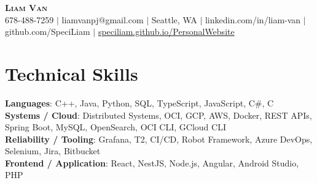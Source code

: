 \documentclass[letterpaper,11pt]{article}
\begin{document}

%
\begin{center}
    \textbf{\Huge \scshape Liam Van} \\ \vspace{1pt}
    \small 678-488-7259 $|$ \small {liamvanpj@gmail.com} $|$ Seattle, WA
 {{$|$ linkedin.com/in/liam-van} {$|$ github.com/SpeciLiam} {$|$ \href{https://speciliam.github.io/PersonalWebsite}{speciliam.github.io/PersonalWebsite}}}

\end{center}

\section{Technical Skills}
 \begin{itemize}[leftmargin=0.15in, label={}]
    \small{\item{
     \textbf{Languages}{: C++, Java, Python, SQL, TypeScript, JavaScript, C\#, C} \\
     \textbf{Systems / Cloud}{: Distributed Systems, OCI, GCP, AWS, Docker, REST APIs, Spring Boot, MySQL, OpenSearch, OCI CLI, GCloud CLI} \\
     \textbf{Reliability / Tooling}{: Grafana, T2, CI/CD, Robot Framework, Azure DevOps, Selenium, Jira, Bitbucket} \\
     \textbf{Frontend / Application}{: React, NestJS, Node.js, Angular, Android Studio, PHP} \\
    }}
 \end{itemize}
%
\end{document}
